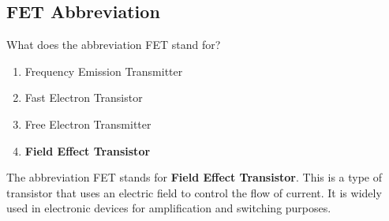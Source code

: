 \subsection{FET Abbreviation}
\label{T6B08}

\begin{tcolorbox}[colback=gray!10!white,colframe=black!75!black,title=T6B08]
What does the abbreviation FET stand for?
\begin{enumerate}[noitemsep]
    \item Frequency Emission Transmitter
    \item Fast Electron Transistor
    \item Free Electron Transmitter
    \item \textbf{Field Effect Transistor}
\end{enumerate}
\end{tcolorbox}

The abbreviation FET stands for \textbf{Field Effect Transistor}. This is a type of transistor that uses an electric field to control the flow of current. It is widely used in electronic devices for amplification and switching purposes.